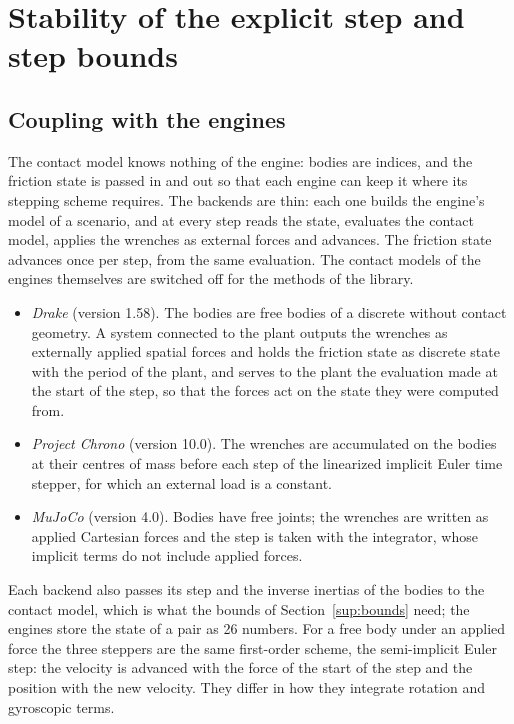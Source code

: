 \section{Stability of the explicit step and step bounds}\label{sup:steps}


\subsection{Coupling with the engines}

The contact model knows nothing of the engine: bodies are indices, and the friction state is
passed in and out so that each engine can keep it where its stepping scheme requires. The
backends are thin: each one builds the engine's model of a scenario, and at every step reads the
state, evaluates the contact model, applies the wrenches as external forces and advances. The
friction state advances once per step, from the same evaluation. The contact models of the
engines themselves are switched off for the methods of the library.
\begin{itemize}
\item \emph{Drake} (version 1.58). The bodies are free bodies of a discrete
   without contact geometry. A system connected to the plant outputs the
  wrenches as externally applied spatial forces and holds the friction state as discrete state
  with the period of the plant, and serves to the plant the evaluation made at the start of the
  step, so that the forces act on the state they were computed from.
\item \emph{Project Chrono} (version 10.0). The wrenches are accumulated on the bodies at their
  centres of mass before each step of the linearized implicit Euler time stepper, for which an
  external load is a constant.
\item \emph{MuJoCo} (version 4.0). Bodies have free joints; the wrenches are written as applied
  Cartesian forces and the step is taken with the  integrator, whose implicit
  terms do not include applied forces.
\end{itemize}
Each backend also passes its step and the inverse inertias of the bodies to the contact model,
which is what the bounds of Section~\ref{sup:bounds} need; the engines store the state of a
pair as 26 numbers. For a free body under an applied force the three steppers are the same
first-order scheme, the semi-implicit Euler step: the velocity is advanced with the force of
the start of the step and the position with the new velocity. They differ in how they integrate
rotation and gyroscopic terms.

